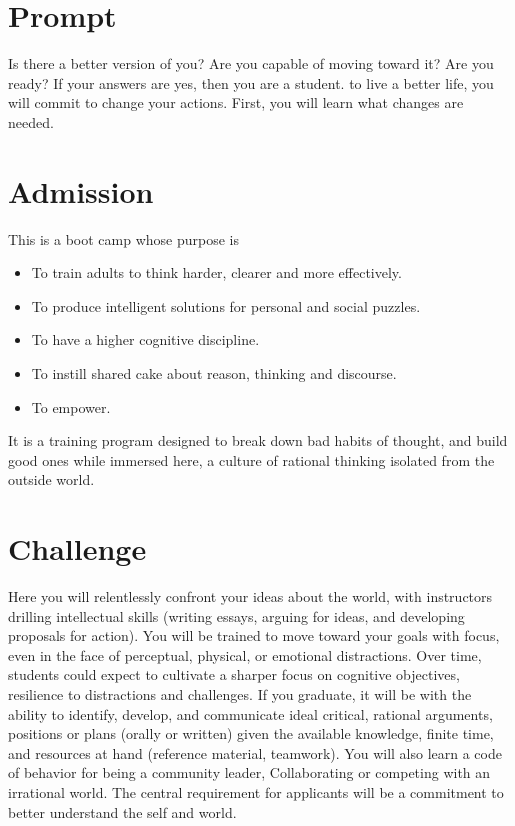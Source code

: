 \documentclass[
]{book}
\providecommand{\tightlist}{%
  \setlength{\itemsep}{0pt}\setlength{\parskip}{0pt}}
\begin{document}
\section{Prompt}\label{prompt}

Is there a better version of you?
Are you capable of moving toward it?
Are you ready?
If your answers are yes, then you are a student. to live a better life, you will commit to change your actions.
First, you will learn what changes are needed.

\section{Admission}\label{admission}

This is a boot camp whose purpose is

\begin{itemize}
\tightlist
\item
  To train adults to think harder, clearer and more effectively.\\
\item
  To produce intelligent solutions for personal and social puzzles.\\
\item
  To have a higher cognitive discipline.\\
\item
  To instill shared cake about reason, thinking and discourse.\\
\item
  To empower.
\end{itemize}

It is a training program designed to break down bad habits of thought, and build good ones while immersed here, a culture of rational thinking isolated from the outside world.

\section{Challenge}\label{challenge}

Here you will relentlessly confront your ideas about the world, with instructors drilling intellectual skills (writing essays, arguing for ideas, and developing proposals for action).
You will be trained to move toward your goals with focus, even in the face of perceptual, physical, or emotional distractions.
Over time, students could expect to cultivate a sharper focus on cognitive objectives, resilience to distractions and challenges.
If you graduate, it will be with the ability to identify, develop, and communicate ideal critical, rational arguments, positions or plans (orally or written) given the available knowledge, finite time, and resources at hand (reference material, teamwork).
You will also learn a code of behavior for being a community leader,
Collaborating or competing with an irrational world.
The central requirement for applicants will be a commitment to better understand the self and world.
\end{document}
